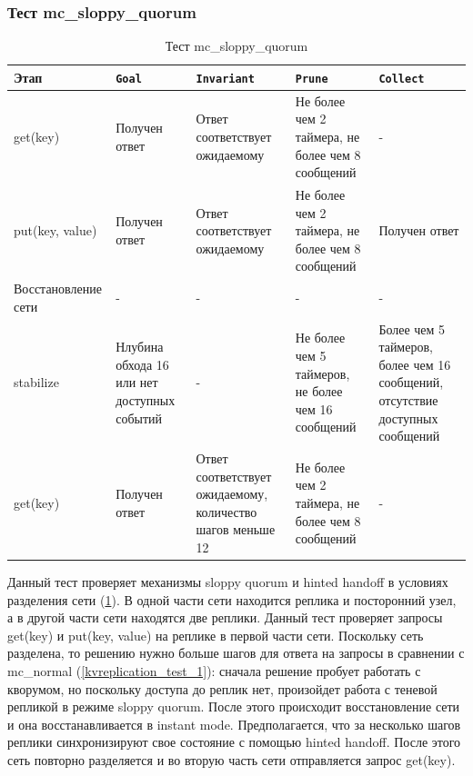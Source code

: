 \documentclass[a4paper,12pt]{extarticle}
\newcommand{\goal}[0]{\texttt{Goal}}
\newcommand{\prune}[0]{\texttt{Prune}}
\newcommand{\invariant}[0]{\texttt{Invariant}}
\newcommand{\collect}[0]{\texttt{Collect}}
\begin{document}
\subsubsection{Тест mc\_sloppy\_quorum}

\label{kvreplication_test_2}


\begin{table}[htbp]
    \caption{Тест mc\_sloppy\_quorum}
    \begin{center}
        \begin{tabular}{|p{}|p{}|p{}|p{}|p{} |}
            \hline
    Этап & \goal & \invariant & \prune & \collect \\
    \hline
    get(key)  & Получен ответ & Ответ соответствует ожидаемому & Не более чем 2 таймера, не более чем 8 сообщений & - \\
    \hline
    put(key, value)  & Получен ответ & Ответ соответствует ожидаемому & Не более чем 2 таймера, не более чем 8 сообщений & Получен ответ \\
    \hline
    Восстановление сети & - & - & - & - \\
    \hline
    stabilize  & Нлубина обхода 16 или нет доступных событий & - & Не более чем 5 таймеров, не более чем 16 сообщений & Более чем 5 таймеров, более чем 16 сообщений, отсутствие доступных сообщений  \\
    \hline
    get(key)  & Получен ответ & Ответ соответствует ожидаемому, количество шагов меньше 12 & Не более чем 2 таймера, не более чем 8 сообщений & - \\
    \hline
    \end{tabular}
    \label{testsloppy}
    \end{center}
\end{table}

Данный тест проверяет механизмы sloppy quorum и hinted handoff в условиях разделения сети (\cref{testsloppy}).
В одной части сети находится реплика и посторонний узел, а в другой части сети находятся две реплики.
Данный тест проверяет запросы get(key) и put(key, value) на реплике в первой части сети.
Поскольку сеть разделена, то решению нужно больше шагов для ответа на запросы в сравнении с mc\_normal (\cref{kvreplication_test_1}): сначала решение пробует работать с кворумом, но поскольку доступа до реплик нет, произойдет работа с теневой репликой в режиме sloppy quorum. 
После этого происходит восстановление сети и она восстанавливается в instant mode.
Предполагается, что за несколько шагов реплики синхронизируют свое состояние с помощью hinted handoff.
После этого сеть повторно разделяется и во вторую часть сети отправляется запрос get(key).
\end{document}
